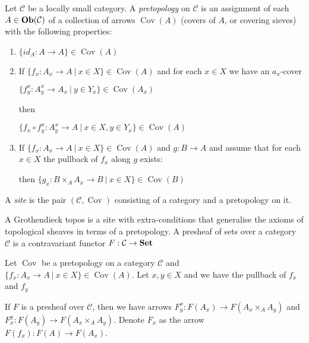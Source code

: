 \documentclass[a4paper]{article}
\theoremstyle{defin}
\theoremstyle{theorem}
\theoremstyle{claim}
\theoremstyle{prop}
\theoremstyle{lemma}
\theoremstyle{fact}
\theoremstyle{ex}
\theoremstyle{col}
\begin{document}
Let $\mathcal{C}$ be a locally small category. A \emph{pretopology} on $\mathcal{C}$ is an assignment of each $A \in {\bf Ob}(\mathcal{C})$ of a collection of arrows $\operatorname{Cov}(A)$ (covers of $A$, or covering sieves) with the following properties:
\begin{enumerate}
\item $\{ id_A : A \to A \} \in \operatorname{Cov}(A)$
\item If $\{ f_x : A_x \to A \: | \: x \in X \} \in \operatorname{Cov}(A)$ and for each $x \in X$ we have an $a_x$-cover
\begin{center}
$\{ f_y^x : A_y^x \to A_x \: | \: y \in Y_x \} \in \operatorname{Cov}(A_x)$
\end{center}
then
\begin{center}
$\{ f_x \circ f_y^x : A^x_y \to A \: | \: x \in X, y \in Y_x\} \in  \operatorname{Cov}(A)$
\end{center}
\item If $\{ f_x : A_x \to A \: | \: x \in X \} \in \operatorname{Cov}(A)$ and $g : B \to A$ and assume that for each $x \in X$ the pullback of $f_x$ along $g$ exists:

then $\{ g_x : B \times_A A_x \to B \:| \: x \in X\} \in \operatorname{Cov}(B)$
\end{enumerate}

A \emph{site} is the pair $(\mathcal{C}, \operatorname{Cov})$ consisting of a category and a pretopology on it.

A Grothendieck topos is a site with extra-conditions that generalise the axioms of topological sheaves in terms of a pretopology. A presheaf of sets over a category $\mathcal{C}$ is a contravariant functor $F : \mathcal{C} \to {\bf Set}$

Let $\operatorname{Cov}$ be a pretopology on a category $\mathcal{C}$ and $\{ f_x : A_x \to A \: | \: x \in X \} \in \operatorname{Cov}(A)$. Let $x, y \in X$ and we have the pullback of $f_x$ and $f_y$


If $F$ is a presheaf over $\mathcal{C}$, then we have arrows $F^x_y : F(A_x) \to F(A_x \times_A A_y)$ and $F^y_x : F(A_y) \to F(A_x \times_A A_y)$. Denote $F_x$ as the arrow $F(f_x) : F(A) \to F(A_x)$.
\end{document}
